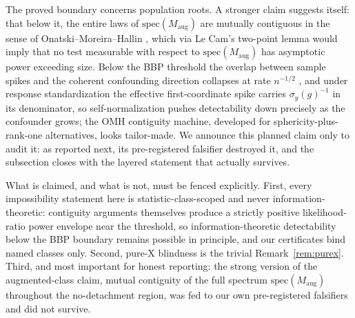 The proved boundary concerns population roots. A stronger claim suggests itself: that below it, the entire laws of $\mathrm{spec}(M_{\mathrm{aug}})$ are mutually contiguous in the sense of Onatski--Moreira--Hallin \citep{onatski2013asymptotic}, which via Le Cam's two-point lemma would imply that no test measurable with respect to $\mathrm{spec}(M_{\mathrm{aug}})$ has asymptotic power exceeding size. Below the BBP threshold the overlap between sample spikes and the coherent confounding direction collapses at rate $n^{-1/2}$ \citep{benaychgeorges2012singular}, and under response standardization the effective first-coordinate spike carries $\sigma_y(g)^{-1}$ in its denominator, so self-normalization pushes detectability down precisely as the confounder grows; the OMH contiguity machine, developed for sphericity-plus-rank-one alternatives, looks tailor-made. We announce this planned claim only to audit it: as reported next, its pre-registered falsifier destroyed it, and the subsection closes with the layered statement that actually survives.

What is claimed, and what is not, must be fenced explicitly. First, every impossibility statement here is statistic-class-scoped and never information-theoretic: contiguity arguments themselves produce a strictly positive likelihood-ratio power envelope near the threshold, so information-theoretic detectability below the BBP boundary remains possible in principle, and our certificates bind named classes only. Second, pure-X blindness is the trivial Remark~\ref{rem:purex}. Third, and most important for honest reporting: the strong version of the augmented-class claim, mutual contiguity of the full spectrum $\mathrm{spec}(M_{\mathrm{aug}})$ throughout the no-detachment region, was fed to our own pre-registered falsifiers and did not survive.


